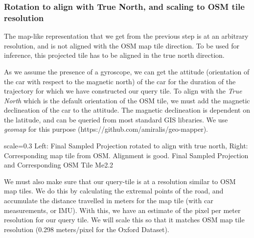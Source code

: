 \pagebreak
\subsubsection{Rotation to align with True North, and scaling to OSM tile resolution}
The map-like representation that we get from the previous step is at an arbitrary resolution, and is not aligned with the OSM map tile direction. To be used for inference, this projected tile has to be aligned in the true north direction. 

As we assume the presence of a gyroscope, we can get the attitude (orientation of the car with respect to the magnetic north) of the car for the duration of the trajectory for which we have constructed our query tile. To align with the \textit{True North} which is the default orientation of the OSM tile, we must add the magnetic declineation of the car to the attitude. The magnetic declineation is dependent on the latitude, and can be queried from most standard GIS libraries. We use \textit{geomap} for this purpose (https://github.com/amiralis/geo-mapper).

{scale=0.3}%
{Left: Final Sampled Projection rotated to align with true north, Right: Corresponding map tile from OSM. Alignment is good.}%
{Final Sampled Projection and Corresponding OSM Tile}%
{Me2.2}

We must also make sure that our query-tile is at a resolution similar to OSM map tiles. We do this by calculating the extremal points of the road, and accumulate the distance travelled in meters for the map tile (with car measurements, or IMU). With this, we have an estimate of the pixel per meter resolution for our query tile. We will scale this so that it matches OSM map tile resolution (0.298 meters/pixel for the Oxford Dataset).

